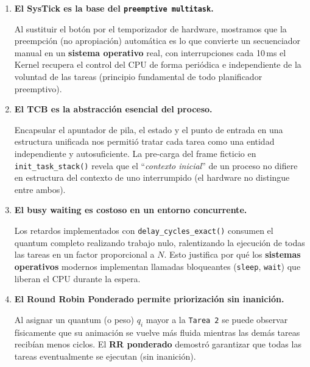 \documentclass[12pt,letterpaper]{article}
\begin{document}
\begin{enumerate}[label=\textbf{\arabic*.}]
\item \textbf{El SysTick es la base del \texttt{preemptive multitask}.}
  
  Al sustituir el botón por el temporizador de hardware, mostramos que la preempción (no apropiación) automática es lo que convierte un secuenciador manual en un \textbf{sistema operativo} real, con interrupciones cada 10\,ms el Kernel recupera el control del CPU de forma periódica e independiente de la voluntad de las tareas (principio fundamental de todo planificador preemptivo).
  
\item \textbf{El TCB es la abstracción esencial del proceso.}
  
  Encapsular el apuntador de pila, el estado y el punto de entrada en una estructura unificada nos permitió tratar cada tarea como una entidad independiente y autosuficiente. La pre-carga del frame ficticio en \texttt{init\_task\_stack()} revela que el ``\textit{contexto inicial}'' de un proceso no difiere en estructura del contexto de uno interrumpido (el hardware no distingue entre ambos).
  
\item \textbf{El busy waiting es costoso en un entorno concurrente.}
  
  Los retardos implementados con \texttt{delay\_cycles\_exact()} consumen el quantum completo realizando trabajo nulo, ralentizando la ejecución de todas las tareas en un factor proporcional a $N$. Esto justifica por qué los \textbf{sistemas operativos} modernos implementan llamadas bloqueantes (\texttt{sleep}, \texttt{wait}) que liberan el CPU durante la espera.
  
\item \textbf{El Round Robin Ponderado permite priorización sin inanición.}
  
  Al asignar un quantum (o peso) $q_i$ mayor a la \texttt{Tarea 2} se puede observar físicamente que su animación se vuelve más fluida mientras las demás tareas recibían menos ciclos. El \textbf{RR ponderado} demostró garantizar que todas las tareas eventualmente se ejecutan (sin inanición).
\end{enumerate}
\end{document}
